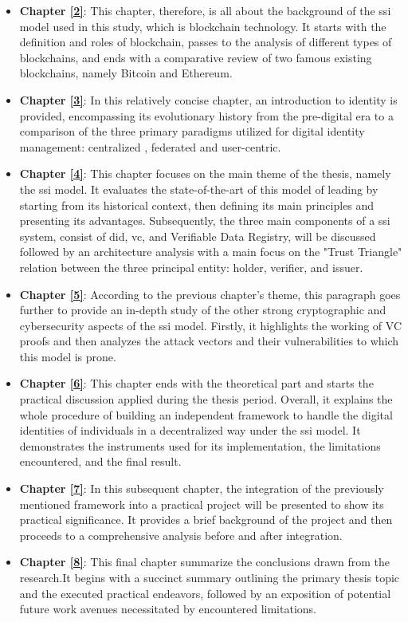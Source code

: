 \begin{itemize}
  \item \textbf{Chapter \hyperref[ch:blockchain]{[2]}}: This chapter, therefore, is all about the background of the \gls{ssi} model used in 
  this study, which is blockchain technology. It starts with the definition and roles of blockchain, passes to the analysis of different types of blockchains, and ends 
  with a comparative review of two famous existing blockchains, namely Bitcoin and Ethereum.
  \item \textbf{Chapter \hyperref[ch:identity]{[3]}}: In this relatively concise chapter, an introduction to identity is provided, encompassing its evolutionary history 
  from the pre-digital era to a comparison of the three primary paradigms utilized for digital identity management: centralized , federated and user-centric.
  \item \textbf{Chapter \hyperref[ch:ssi]{[4]}}: This chapter focuses on the main theme of the thesis, namely the \gls{ssi} model. It evaluates the state-of-the-art of this 
  model of leading by starting from its historical context, then defining its main principles and presenting its advantages. Subsequently, the three main components of a 
  \gls{ssi} system, consist of \gls{did}, \gls{vc}, and Verifiable Data Registry, will be discussed 
  followed by an architecture analysis with a main focus on the "Trust Triangle" relation between the three principal entity: holder, verifier, and issuer.
  \item \textbf{Chapter \hyperref[ch:security]{[5]}}: According to the previous chapter's theme, this paragraph goes further to provide an in-depth study of the other 
  strong cryptographic and cybersecurity aspects of the \gls{ssi} model. Firstly, it highlights the working of VC proofs and then analyzes the attack vectors and their 
  vulnerabilities to which this model is prone.
  \item \textbf{Chapter \hyperref[ch:framework]{[6]}}: This chapter ends with the theoretical part and starts the practical discussion applied during the thesis period. 
  Overall, it explains the whole procedure of building an independent framework to handle the digital identities of individuals in a decentralized way under the \gls{ssi} model. 
  It demonstrates the instruments used for its implementation, the limitations encountered, and the final result.
  \item \textbf{Chapter \hyperref[ch:integration]{[7]}}: In this subsequent chapter, the integration of the previously mentioned framework into a practical project will be 
  presented to show its practical significance. It provides a brief background of the project and then proceeds to a comprehensive analysis before and after integration.
  \item \textbf{Chapter \hyperref[ch:conclusions]{[8]}}: This final chapter summarize the conclusions drawn from the research.It begins with a succinct summary outlining 
  the primary thesis topic and the executed practical endeavors, followed by an exposition of potential future work avenues necessitated by encountered limitations.
\end{itemize}